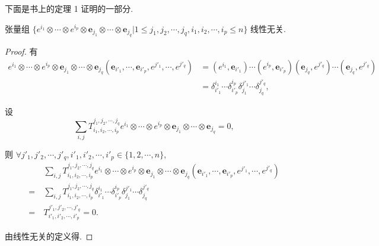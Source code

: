 \documentclass[color=black,device=normal,lang=cn,mode=geye]{elegantnote}
\begin{document}
下面是书上的定理 1 证明的一部分.
\begin{theorem}\label{t1.1}
    张量组 $\{e^{i_1}\otimes\cdots\otimes e^{i_p}\otimes\boldsymbol{e}_{j_1}\otimes\cdots\otimes\boldsymbol{e}_{j_q}|1\leq j_1,j_2,\cdots,j_q,i_1,i_2,\cdots,i_p\leq n\}$ 线性无关.
\end{theorem}
\begin{proof}
    有
    \begin{align*}
        e^{i_1}\otimes\cdots\otimes e^{i_p}\otimes\boldsymbol{e}_{j_1}\otimes\cdots\otimes\boldsymbol{e}_{j_q}(\boldsymbol{e}_{i'_1},\cdots,\boldsymbol{e}_{i'_p},e^{j'_1},\cdots,e^{j'_q}) & =(e^{i_1},\boldsymbol{e}_{i'_1})\cdots(e^{i_p},\boldsymbol{e}_{i'_p})(\boldsymbol{e}_{j_q},e^{j'_q})\cdots(\boldsymbol{e}_{j_q},e^{j'_q}) \\
        & =\delta_{i'_1}^{i_1}\cdots\delta_{i'_p}^{i_p}\delta_{j_1}^{j'_1}\cdots\delta_{j_q}^{j'_q},
    \end{align*}

    设
    \[\sum\limits_{i,j}T^{j_1,j_2,\cdots,j_q}_{i_1,i_2,\cdots,i_p}e^{i_1}\otimes\cdots\otimes e^{i_p}\otimes\boldsymbol{e}_{j_1}\otimes\cdots\otimes\boldsymbol{e}_{j_q}=0,\]

    则 $\forall j'_1,j'_2,\cdots,j'_q,i'_1,i'_2,\cdots,i'_p\in\{1,2,\cdots,n\}$,
    \begin{align*}
        & \sum\limits_{i,j}T^{j_1,j_2,\cdots,j_q}_{i_1,i_2,\cdots,i_p}e^{i_1}\otimes\cdots\otimes e^{i_p}\otimes\boldsymbol{e}_{j_1}\otimes\cdots\otimes\boldsymbol{e}_{j_q}(\boldsymbol{e}_{i'_1},\cdots,\boldsymbol{e}_{i'_p},e^{j'_1},\cdots,e^{j'_q}) \\
        =\ & \sum\limits_{i,j}T^{j_1,j_2,\cdots,j_q}_{i_1,i_2,\cdots,i_p}\delta_{i'_1}^{i_1}\cdots\delta_{i'_p}^{i_p}\delta_{j_1}^{j'_1}\cdots\delta_{j_q}^{j'_q} \\
        =\ & T^{j'_1,j'_2,\cdots,j'_q}_{i'_1,i'_2,\cdots,i'_p}=0.
    \end{align*}

    由线性无关的定义得.
\end{proof}
\end{document}
